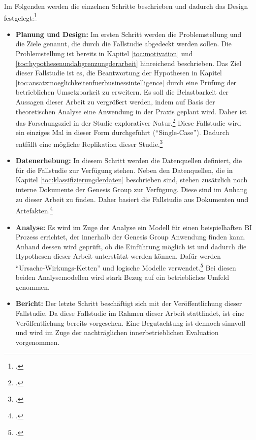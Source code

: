 Im Folgenden werden die einzelnen Schritte beschrieben und dadurch das Design
festgelegt:\footcite[Vgl.][S. 8ff]{gothlich2003fallstudien}
\begin{itemize}
    \item \textbf{Planung und Design: }Im ersten Schritt werden die Problemstellung und die Ziele genannt, die durch die Fallstudie
    abgedeckt werden sollen. Die Problemstellung ist bereits in Kapitel \ref{toc:motivation} und \ref{toc:hypothesenundabgrenzungderarbeit}
    hinreichend beschrieben. Das Ziel dieser Fallstudie ist es, die Beantwortung der Hypothesen in Kapitel \ref{toc:ansatzmoeglichkeitenfuerbusinessintelligence}
    durch eine Prüfung der betrieblichen Umsetzbarkeit zu erweitern. Es soll die Belastbarkeit der Aussagen dieser Arbeit zu vergrößert werden, indem
    auf Basis der theoretischen Analyse eine Anwendung in der Praxis geplant wird.
    Daher ist das Forschungsziel in der Studie explorativer Natur.\footcite[Vgl.][S. 8]{gothlich2003fallstudien}
    Diese Fallstudie wird ein einziges Mal in dieser Form durchgeführt (``Single-Case''). Dadurch entfällt eine mögliche Replikation dieser Studie.\footcite[Vgl.][S. 8f]{gothlich2003fallstudien}
    \item \textbf{Datenerhebung: }In diesem Schritt werden die Datenquellen definiert, die für die Fallstudie zur Verfügung stehen. Neben den
    Datenquellen, die in Kapitel \ref{toc:klassifizierungderdaten} beschrieben sind, stehen zusätzlich noch interne Dokumente der Genesis
    Group zur Verfügung. Diese sind im Anhang zu dieser Arbeit zu finden. Daher basiert die Fallstudie aus Dokumenten und Artefakten.\footcite[Vgl.][Tabelle 1 ]{gothlich2003fallstudien}
    \item \textbf{Analyse: }Es wird im Zuge der Analyse ein Modell für einen beispielhaften \ac{BI} Prozess errichtet,
    der innerhalb der Genesis Group Anwendung finden kann. Anhand dessen wird geprüft, ob die Einführung möglich ist und dadurch die
    Hypothesen dieser Arbeit unterstützt werden können. Dafür werden "`Ursache-Wirkungs-Ketten"' und logische Modelle verwendet.\footcite[Vgl.][S. 11]{gothlich2003fallstudien}
    Bei diesen beiden Analysemodellen wird stark Bezug auf ein betriebliches Umfeld genommen.
    \item \textbf{Bericht: }Der letzte Schritt beschäftigt sich mit der Veröffentlichung dieser Fallstudie. Da diese Fallstudie im Rahmen
    dieser Arbeit stattfindet, ist eine Veröffentlichung bereits vorgesehen. Eine Begutachtung ist dennoch sinnvoll und wird im Zuge
    der nachträglichen innerbetrieblichen Evaluation vorgenommen.
\end{itemize}


